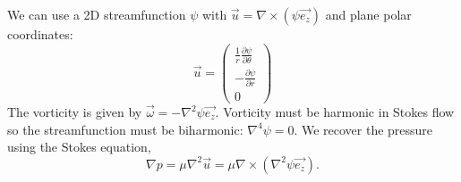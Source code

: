 \documentclass[../Main.tex]{subfiles}
\begin{document}
We can use a 2D streamfunction $\psi$ with $\vec{u} = \nabla \times (\psi\vec{e_z})$ and plane polar coordinates:
\begin{equation*}
    \vec{u} = \begin{pmatrix}\frac1r \frac{\partial \psi}{\partial \theta} \\ -\frac{\partial \psi}{\partial r} \\ 0\end{pmatrix}
\end{equation*}
The vorticity is given by $\vec{\omega} = -\nabla^2\psi \vec{e_z}$. Vorticity must be harmonic in Stokes flow so the streamfunction must be biharmonic: $\nabla^4 \psi = 0$. We recover the pressure using the Stokes equation,
\begin{equation*}
    \nabla p = \mu \nabla^2\vec{u} = \mu \nabla \times (\nabla^2 \psi \vec{e_z}).
\end{equation*}
\end{document}
